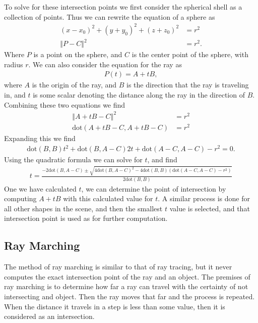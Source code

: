 \documentclass[../pbr.tex]{subfile}
\begin{document}
To solve for these intersection points we first consider the spherical shell
as a collection of points. Thus we can rewrite the equation of a sphere as
\begin{align*}
   {\left(x-x_0\right)}^2+{\left(y+y_0\right)}^2+{\left(z+z_0\right)}^2&=r^2\\
   {\left\Vert P-C\right\Vert}^2&=r^2.
\end{align*}
Where $P$ is a point on the sphere, and $C$ is the center point of the sphere,
with radius $r$. We can also consider the equation for the ray as
\begin{align*}
   P(t)=A+tB,
\end{align*}
where $A$ is the origin of the ray, and $B$ is the direction that
the ray is traveling in, and $t$ is some scalar denoting the distance along the
ray in the direction of $B$. Combining these two equations we find
\begin{align*}
  {\left\Vert A+tB-C\right\Vert}^2&=r^2\\
  \text{dot}\left(A+tB-C,A+tB-C\right)&=r^2
\end{align*}
Expanding this we find
\begin{align*}
  \text{dot}\left(B,B\right)t^2+\text{dot}\left(B,A-C\right)2t+\text{dot}\left(A-C,A-C\right)-r^2=0.
\end{align*}
Using the quadratic formula we can solve for $t$, and find
\begin{align*}
   t=\frac{-2\text{dot}\left(B,A-C\right)\pm\sqrt{{4\text{dot}\left(B,A-C\right)}^2-4\text{dot}\left(B,B\right)\left(\text{dot}\left(A-C,A-C\right)-r^2\right)}}{2\text{dot}\left(B,B\right)}
\end{align*}
One we have calculated $t$, we can determine the point of intersection by
computing $A+tB$ with this calculated value for $t$. A similar process is done
for all other shapes in the scene, and then the smallest $t$ value is selected,
and that intersection point is used as for further computation.

\subsection{Ray Marching}%
\label{sub:ray_marching}

The method of ray marching is similar to that of ray tracing, but it never
computes the exact intersection point of the ray and an object. The premises of
ray marching is to determine how far a ray can travel with the certainty of not
intersecting and object. Then the ray moves that far and the process is
repeated. When the distance it travels in a step is less than some value, then
it is considered as an intersection.
\end{document}
